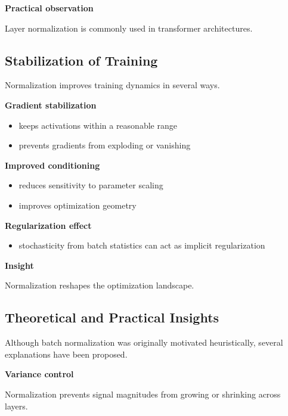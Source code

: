 \medskip

\textbf{Practical observation}

Layer normalization is commonly used in transformer architectures.

\subsection{Stabilization of Training}

Normalization improves training dynamics in several ways.

\medskip

\textbf{Gradient stabilization}

\begin{itemize}
\item keeps activations within a reasonable range
\item prevents gradients from exploding or vanishing
\end{itemize}

\medskip

\textbf{Improved conditioning}

\begin{itemize}
\item reduces sensitivity to parameter scaling
\item improves optimization geometry
\end{itemize}

\medskip

\textbf{Regularization effect}

\begin{itemize}
\item stochasticity from batch statistics can act as implicit regularization
\end{itemize}

\medskip

\textbf{Insight}

Normalization reshapes the optimization landscape.

\subsection{Theoretical and Practical Insights}

Although batch normalization was originally motivated heuristically, several explanations have been proposed.

\medskip

\textbf{Variance control}

Normalization prevents signal magnitudes from growing or shrinking across layers.

